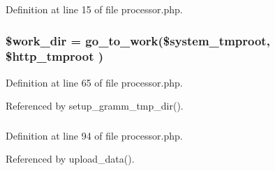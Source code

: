 Definition at line 15 of file processor.php.
\subsubsection{\setlength{\rightskip}{0pt plus 5cm}\$work\_\-dir = go\_\-to\_\-work(\$system\_\-tmproot, \$http\_\-tmproot )}\label{processor_8php_a9}




Definition at line 65 of file processor.php.

Referenced by setup\_\-gramm\_\-tmp\_\-dir().
\subsubsection{}\label{processor_8php_a10}




Definition at line 94 of file processor.php.

Referenced by upload\_\-data().